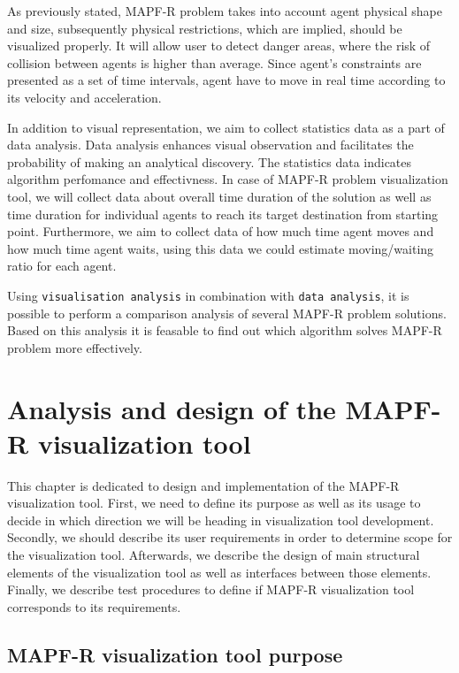 \documentclass[thesis=B,english]{FITthesis}[2019/12/23]
\begin{document}
As previously stated, MAPF-R problem takes into account agent physical shape and size, subsequently physical restrictions, which are implied, should be visualized properly. It will allow user to detect danger areas, where the risk of collision between agents is higher than average. Since agent's constraints are presented as a set of time intervals, agent have to move in real time according to its velocity and acceleration.

In addition to visual representation, we aim to collect statistics data as a part of data analysis. Data analysis enhances visual observation and facilitates the probability of making an analytical discovery. The statistics data indicates algorithm perfomance and effectivness. In case of MAPF-R problem visualization tool, we will collect data about overall time duration of the solution as well as time duration for individual agents to reach its target destination from starting point. Furthermore, we aim to collect data of how much time agent moves and how much time agent waits, using this data we could estimate moving/waiting ratio for each agent. 

Using \verb|visualisation analysis| in combination with \verb|data analysis|, it is possible to perform a comparison analysis of several MAPF-R problem solutions. Based on this analysis it is feasable to find out which algorithm solves MAPF-R problem more effectively.


\chapter{Analysis and design of the MAPF-R visualization tool}

This chapter is dedicated to design and implementation of the MAPF-R visualization tool. First, we need to define its purpose as well as its usage to decide in which direction we will be heading in visualization tool development. Secondly, we should describe its user requirements in order to determine scope for the visualization tool. Afterwards, we describe the design of main structural elements of the visualization tool as well as interfaces between those elements. Finally, we describe test procedures to define if MAPF-R visualization tool corresponds to its requirements.

\section{MAPF-R visualization tool purpose}
\end{document}
